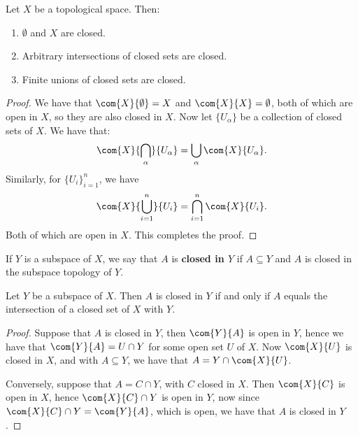 \begin{theorem}\label{1.6.1}
    Let $X$ be a topological space. Then:
         \begin{enumerate}[label=(\arabic*)]
             \item $\emptyset$ and  $X$ are closed.

             \item Arbitrary intersections of closed sets are closed.

             \item Finite unions of closed sets are closed.
        \end{enumerate}
\end{theorem}
\begin{proof}
    We have that $\com{X}{\emptyset}=X$ and  $\com{X}{X}=\emptyset$, both of
    which are open in  $X$, so they are also closed in  $X$. Now let
    $\{U_{\alpha}\}$ be a collection of closed sets of  $X$. We have that:
        \begin{equation*}
            \com{X}{\bigcap_{\alpha}}{U_{\alpha}}=\bigcup_{\alpha}{\com{X}{U_{\alpha}}}.
        \end{equation*}
        Similarly, for $\{U_i\}_{i=1}^{n}$, we have
        \begin{equation*}
            \com{X}{\bigcup_{i=1}^{n}}{U_{i}}=\bigcap_{i=1}^{n}{\com{X}{U_{i}}}.
        \end{equation*}
    Both of which are open in $X$. This completes the proof.
\end{proof}

\begin{definition}
    If $Y$ is a subspace of  $X$, we say that  $A$ is  \textbf{closed in $Y$} if
    $A \subseteq Y$ and  $A$ is closed in the subspace topology of  $Y$.
\end{definition}

\begin{theorem}\label{1.6.2}
    Let $Y$ be a subspace of  $X$. Then  $A$ is closed in  $Y$ if and only if
    $A$ equals the intersection of a closed set of  $X$ with  $Y$.
\end{theorem}
\begin{proof}
    Suppose that $A$ is closed in  $Y$, then  $\com{Y}{A}$ is open in  $Y$,
    hence we have that  $\com{Y}{A}=U \cap Y$ for some open set $U$ of  $X$. Now
    $\com{X}{U}$ is closed in  $X$, and with  $A \subseteq Y$, we have that
    $A=Y \cap \com{X}{U}$.

    Conversely, suppose that $A=C \cap Y$, with  $C$ closed in  $X$. Then
    $\com{X}{C}$ is open in  $X$, hence  $\com{X}{C} \cap Y$ is open in  $Y$,
    now since  $\com{X}{C} \cap Y=\com{Y}{A}$, which is open, we have that  $A$
    is closed in  $Y$.
\end{proof}

